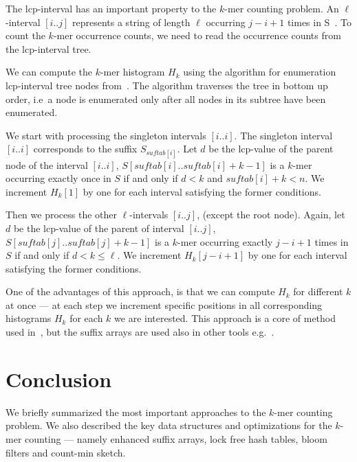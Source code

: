 
The lcp-interval has an important property to the $k$-mer counting problem. An $\ell$-interval $[i..j]$ represents a string of length $\ell$ occurring $j - i + 1$ times in S~\cite{tallymer}. To count the $k$-mer occurrence counts, we need to read the occurrence counts from the lcp-interval tree.

We can compute the $k$-mer histogram $H_k$ using the algorithm for enumeration lcp-interval tree nodes from~\cite{enhancedsuffixarrays}. The algorithm traverses the tree in bottom up order, i.e\ a node is enumerated only after all nodes in its subtree have been enumerated.

We start with processing the singleton intervals $[i..i]$. The singleton interval $[i..i]$ corresponds to the suffix $S_{suftab[i]}$. Let $d$ be the lcp-value of the parent node of the interval $[i..i]$, $S[suftab[i]..suftab[i]+k-1]$ is a $k$-mer occurring exactly once in $S$ if and only if $d < k$ and $suftab[i]+k < n$. We increment $H_k[1]$ by one for each interval satisfying the former conditions.

Then we process the other $\ell$-intervals $[i..j]$, (except the root node). Again, let $d$ be the lcp-value of the parent of interval $[i..j]$, $S[suftab[j]..suftab[j] + k - 1]$ is a $k$-mer occurring exactly $j - i + 1$ times in $S$ if and only if $d < k \leq \ell$. We increment $H_k[j-i+1]$ by one for each interval satisfying the former conditions.

One of the advantages of this approach, is that we can compute $H_k$ for different $k$ at once --- at each step we increment specific positions in all corresponding histograms $H_k$ for each $k$ we are interested. This approach is a core of method used in~\cite{tallymer}, but the suffix arrays are used also in other tools e.g.~\cite{jellyfish}.


\section{Conclusion}

We briefly summarized the most important approaches to the $k$-mer counting problem. We also described the key data structures and optimizations for the $k$-mer counting --- namely enhanced suffix arrays, lock free hash tables, bloom filters and count-min sketch.

